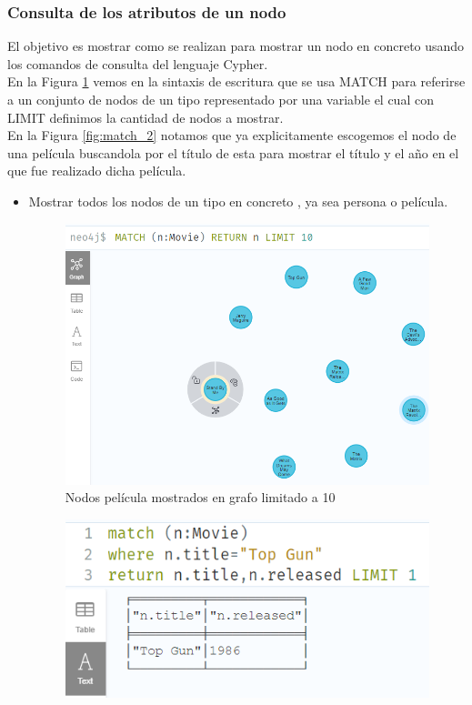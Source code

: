 \subsubsection{Consulta de los atributos de un nodo}
El objetivo es mostrar como se realizan para mostrar un nodo en concreto usando los comandos de consulta del lenguaje Cypher.\\
En la Figura \ref{fig:match_1} vemos en la sintaxis de escritura que se usa MATCH para referirse a un conjunto de nodos de un tipo representado por una variable el cual con LIMIT definimos la cantidad de nodos a mostrar.\\
En la Figura \ref{fig:match_2} notamos que ya explicitamente escogemos el nodo de una película buscandola por el título de esta para mostrar el título y el año en el que fue realizado dicha película.
\begin{itemize}
    \item Mostrar todos los nodos de un tipo en concreto , ya sea persona o película.
    \begin{figure}[H]
    \centering
    \includegraphics[scale=0.6]{Graficos/match1.png}
    \caption{Nodos película mostrados en grafo limitado a 10}
    \label{fig:match_1}
    \end{figure}
    \begin{figure}[H]
    \centering
    \includegraphics[scale=0.85]{Graficos/match2.png}

\end{figure}
\end{itemize}

